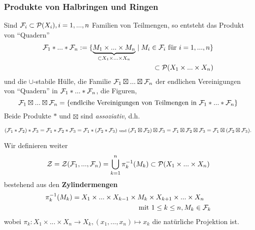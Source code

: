 \subsubsection{Produkte von Halbringen und Ringen}
Sind $\mathcal{F}_i \subset \mathcal{P}(X_i), i=1,...,n$ Familien von Teilmengen, so entsteht das Produkt von ``Quadern''
\begin{equation*}
\begin{split}
\mathcal{F}_1 \ast ... \ast \mathcal{F}_n := \{ \underbrace{M_1 \times ... \times M_n}_{\subset X_1 \times ... \times X_n} \mid M_i \in \mathcal{F}_i \text{ für } i=1,...,n\}  \\ \subset  \mathcal{P}(X_1 \times ... \times X_n)
\end{split}
\end{equation*}
und die $\cup$-stabile Hülle, die Familie $\mathcal{F}_1 \boxtimes ... \boxtimes \mathcal{F}_n$ der endlichen Vereinigungen von ``Quadern'' in $\mathcal{F}_1 \ast ... \ast \mathcal{F}_n$, die Figuren, 
\begin{equation*}
\mathcal{F}_1 \boxtimes ... \boxtimes \mathcal{F}_n = \left\{\text{endlcihe Vereinigungen von Teilmengen in } \mathcal{F}_1 \ast ... \ast \mathcal{F}_n	\right\}
\end{equation*}
Beide Produkte $\ast$ und $\boxtimes$ sind \emph{assoziativ}, d.h.\begin{small}
\begin{equation*}
(\mathcal{F}_1 \ast \mathcal{F}_2) \ast \mathcal{F}_3 = \mathcal{F}_1 \ast \mathcal{F}_2 \ast \mathcal{F}_3 = \mathcal{F}_1 \ast (\mathcal{F}_2 \ast \mathcal{F}_3)
\text{ \scriptsize und }
(\mathcal{F}_1 \boxtimes \mathcal{F}_2) \boxtimes \mathcal{F}_3 = \mathcal{F}_1 \boxtimes \mathcal{F}_2 \boxtimes \mathcal{F}_3 = \mathcal{F}_1 \boxtimes (\mathcal{F}_2 \boxtimes \mathcal{F}_3).
\end{equation*}
\end{small}
Wir definieren weiter
\begin{equation*}
\mathcal{Z} = 
\mathcal{Z} (\FF_1,...,\FF_n) = \bigcup_{k=1}^n \pi_k^{-1}(M_k)\subset \PP(X_1 \times ...\times X_n) %
\end{equation*}
bestehend aus den \textbf{Zylindermengen}
\begin{equation*}
\begin{split}
\pi_k^{-1}(M_k) = X_1 \times ... \times X_{k-1} \times M_k \times X_{k+1} \times ... \times X_n \quad\\ \text{mit } 1 \leq k \leq n, M_k \in \mathcal{F}_k
\end{split}
\end{equation*}
wobei $\pi_k: X_1 \times ... \times X_n \to X_k, (x_1,...,x_n) \mapsto x_k$ die natürliche Projektion ist. \\
